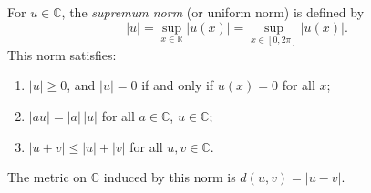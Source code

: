 For $u \in \mathbb{C}$, the \emph{supremum norm} (or uniform norm) is defined by
$$|u| = \sup_{x \in \mathbb{R}} |u(x)| = \sup_{x \in [0, 2\pi]} |u(x)|.$$
This norm satisfies:
\begin{enumerate}
\item $|u| \geq 0$, and $|u| = 0$ if and only if $u(x) = 0$ for all $x$;
\item $|au| = |a| \, |u|$ for all $a \in \mathbb{C}$, $u \in \mathbb{C}$;
\item $|u + v| \leq |u| + |v|$ for all $u, v \in \mathbb{C}$.
\end{enumerate}
The metric on $\mathbb{C}$ induced by this norm is $d(u, v) = |u - v|$.
